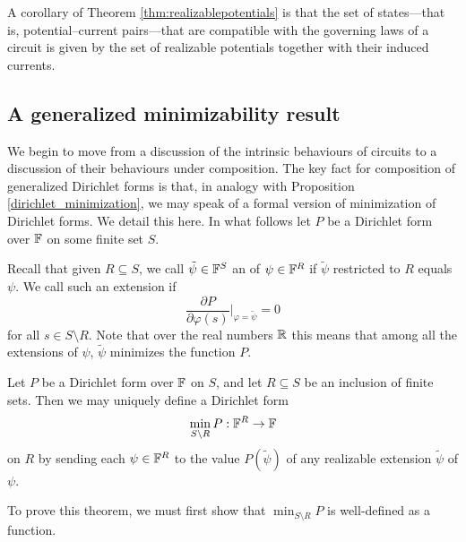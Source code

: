 A corollary of Theorem \ref{thm:realizablepotentials} is that the set of
states---that is, potential--current pairs---that are compatible with the
governing laws of a circuit is given by the set of realizable potentials
together with their induced currents. 

\subsection{A generalized minimizability result}

We begin to move from a discussion of the intrinsic behaviours of circuits to a
discussion of their behaviours under composition. The key fact for composition
of generalized Dirichlet forms is that, in analogy with Proposition
\ref{dirichlet_minimization}, we may speak of a formal version of minimization
of Dirichlet forms. We detail this here.  In what follows let $P$ be a Dirichlet
form over ${\mathbb F}$ on some finite set $S$. 

Recall that given $R \subseteq S$, we
call $\tilde\psi \in {\mathbb F}^S$ an  of $\psi \in {\mathbb F}^R$ if
$\tilde\psi$ restricted to $R$ equals $\psi$.   We call such an
extension  if 
\[
    \frac{\partial P}{\partial \varphi(s)}\bigg\vert_{\varphi = \tilde\psi} = 0
  \]
for all $s \in S \setminus R$.  Note that over the real numbers ${\mathbb{R}}$ this means
that among all the extensions of $\psi$, $\tilde\psi$ minimizes the function $P$.

\begin{theorem} \label{thm:dirichletminimization}
  Let $P$ be a Dirichlet form over ${\mathbb F}$ on $S$, and let $R \subseteq S$ be an
  inclusion of finite sets. Then we may uniquely define a Dirichlet form
  \[\min_{S \setminus R}P: {\mathbb F}^R \to {\mathbb F}\] 
   on $R$ by sending each $\psi \in {\mathbb F}^R$ to
  the value $P(\tilde\psi)$ of any realizable extension $\tilde\psi$ of $\psi$.
\end{theorem}


To prove this theorem, we must first show that $\min_{S \setminus R} P$ is well-defined as a function.

